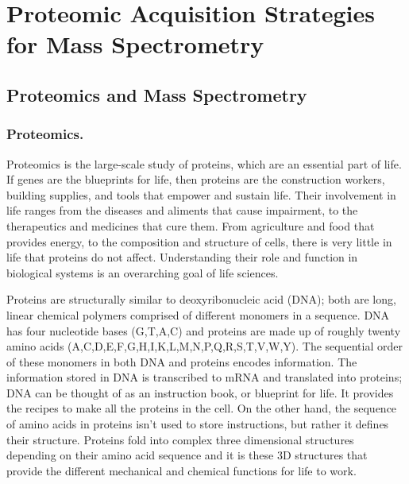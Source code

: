 \chapter{Proteomic Acquisition Strategies for Mass Spectrometry}

\section{Proteomics and Mass Spectrometry}

\subsection{Proteomics.}
Proteomics is the large-scale study of proteins, which are an essential part of life. If genes are the blueprints for life, then proteins are the construction workers, building supplies, and tools that empower and sustain life. Their involvement in life ranges from the diseases and aliments that cause impairment, to the therapeutics and medicines that cure them. From agriculture and food that provides energy, to the composition and structure of cells, there is very little in life that proteins do not affect. Understanding their role and function in biological systems is an overarching goal of life sciences. 

Proteins are structurally similar to deoxyribonucleic acid (DNA); both are long, linear chemical polymers comprised of different monomers in a sequence. DNA has four nucleotide bases (G,T,A,C) and proteins are made up of roughly twenty amino acids (A,C,D,E,F,G,H,I,K,L,M,N,P,Q,R,S,T,V,W,Y). The sequential order of these monomers in both DNA and proteins encodes information. The information stored in DNA is transcribed to mRNA and translated into proteins; DNA can be thought of as an instruction book, or blueprint for life. It provides the recipes to make all the proteins in the cell. On the other hand, the sequence of amino acids in proteins isn't used to store instructions, but rather it defines their structure. Proteins fold into complex three dimensional structures depending on their amino acid sequence and it is these 3D structures that provide the different mechanical and chemical functions for life to work.

